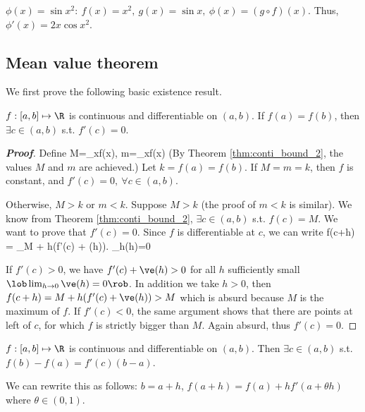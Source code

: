 \begin{example}
$\phi(x)=\sin x^2: \ f(x)=x^2, \ g(x)=\sin x,\ \phi(x) = (g\circ f)(x)$. Thus, $\phi'(x) = 2x \cos x^2$.
\end{example}



\subsection{Mean value theorem}

We first prove the following basic existence result.

\begin{theorem}\label{thm:rolle_analysis}
$f: [a,b]\mapsto \R$ is continuous and differentiable on $(a,b)$. If $f(a)=f(b)$, then $\exists c\in (a,b)$ s.t. $f'(c)=0$.
\end{theorem}

\begin{proof}[{\bf Proof}]
Define
\be
M=\max_{x\in[a,b]}f(x), \quad m=\min_{x\in[a,b]}f(x)
\ee
(By Theorem \ref{thm:conti_bound_2}, the values $M$ and $m$ are achieved.) Let $k=f(a)=f(b)$. If $M=m=k$, then $f$ is constant, and $f'(c)=0,\ \forall c\in(a,b)$.

Otherwise, $M>k$ or $m<k$. Suppose $M>k$ (the proof of $m<k$ is similar). We know from Theorem \ref{thm:conti_bound_2}, $\exists c\in(a,b)$ s.t. $f(c)=M$. We want to prove that $f'(c)=0$. Since $f$ is differentiable at $c$, we can write
\be
f(c+h) = _{M} + h(f'(c) + \ve(h)). \quad \lob \lim_{h}\ve(h)=0\rob
\ee

If $f'(c)>0$, we have $f'(c) + \ve(h)>0$ for all $h$ sufficiently small $\lob \lim_{h\to 0}\ve(h)=0\rob $. In addition we take $h>0$, then $f(c+h) = M + h(f'(c) + \ve(h)) > M$ which is absurd because $M$ is the maximum of $f$. If $f'(c)<0$, the same argument shows that there are points at left of $c$, for which $f$ is strictly bigger than $M$. Again absurd, thus $f'(c)=0$.
\end{proof}

\begin{theorem}\label{thm:mean_value}
$f: [a,b]\mapsto \R$ is continuous and differentiable on $(a,b)$. Then $\exists c \in (a,b)$ s.t. $f(b)-f(a)=f'(c)(b-a)$.
\end{theorem}

\begin{remark}
We can rewrite this as follows: $b=a+h$, $f(a+h)=f(a)+hf'(a+\theta h)$ where $\theta\in(0,1)$.
\end{remark}

